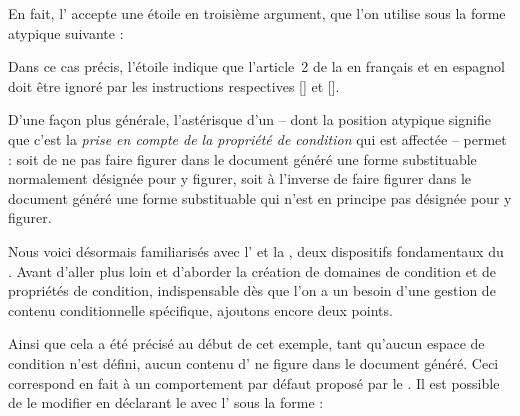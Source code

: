\documentclass{article}
\begin{document}
En fait, l' accepte une étoile en troisième argument, que l'on utilise sous la forme atypique suivante :

\begin{codeblock}
    \codestm{}
\end{codeblock}

\resumepar Dans ce cas précis, l'étoile indique que l'article~2 de la  en français et en espagnol doit être ignoré par les instructions respectives [] et [].

D'une façon plus générale, l'astérisque d'un  -- dont la position atypique signifie que c'est la \emph{prise en compte de la propriété de condition} qui est affectée -- permet : soit de ne pas faire figurer dans le document généré une forme substituable normalement désignée pour y figurer, soit à l'inverse de faire figurer dans le document généré une forme substituable qui n'est en principe pas désignée pour y figurer.

\tutostep
Nous voici désormais familiarisés avec l' et la , deux dispositifs fondamentaux du . Avant d'aller plus loin et d'aborder la création de domaines de condition et de propriétés de condition, indispensable dès que l'on a un besoin d'une gestion de contenu conditionnelle spécifique, ajoutons encore deux points.

Ainsi que cela a été précisé au début de cet exemple, tant qu'aucun espace de condition n'est défini, aucun contenu d' ne figure dans le document généré. Ceci correspond en fait à un comportement par défaut proposé par le . Il est possible de le modifier en déclarant le  avec l' sous la forme :

\end{document}

